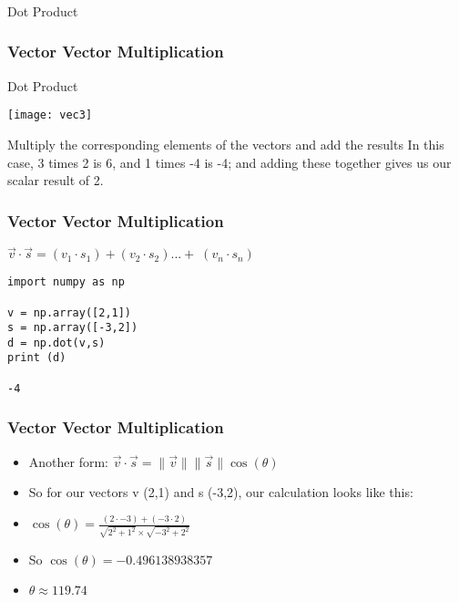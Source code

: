  \begin{frame}[fragile]\frametitle{}
\begin{center}
{\Large Dot Product}
\end{center}
\end{frame}



 \begin{frame}[fragile] \frametitle{Vector Vector Multiplication}
Dot Product
\begin{center}
\texttt{[image: vec3]}
\end{center}

Multiply the corresponding elements of the vectors and add the results In this
case, 3 times 2 is 6, and 1 times -4 is -4; and adding these together
gives us our scalar result of 2. 

\end{frame}


 \begin{frame}[fragile] \frametitle{Vector Vector Multiplication}

$\vec{v} \cdot \vec{s} = (v_{1} \cdot s_{1}) + (v_{2} \cdot s_{2}) ... + \; (v_{n} \cdot s_{n})$
 
 \begin{lstlisting}
import numpy as np

v = np.array([2,1])
s = np.array([-3,2])
d = np.dot(v,s)
print (d)

-4
 \end{lstlisting}
 

 
\end{frame}


 \begin{frame}[fragile] \frametitle{Vector Vector Multiplication}

 \begin{itemize}
 
\item Another form: $\vec{v} \cdot \vec{s} = \|\vec{v} \|\|\vec{s}\| \cos (\theta)$ 

\item So for our vectors v (2,1) and s (-3,2), our calculation looks like this:

\item $\cos(\theta) = \frac{(2 \cdot-3) + (-3 \cdot 2)}{\sqrt{2^{2} + 1^{2}} \times \sqrt{-3^{2} + 2^{2}}}$

\item So $\cos(\theta) = -0.496138938357$

\item $\theta \approx 119.74$
\end{itemize}
 
\end{frame}

